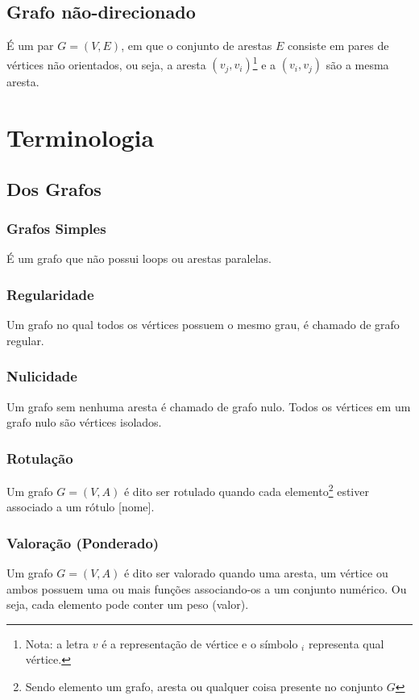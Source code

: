 \documentclass[12pt]{article}
\begin{document}
\subsection{Grafo não-direcionado}
É um par $G = (V, E)$, em que o conjunto de arestas $E$ consiste em pares de vértices não orientados, ou seja, a aresta $(v_j, v_i)$\footnote{
	Nota: a letra $v$ é a representação de vértice e o símbolo $_i$ representa qual vértice.
} e a $(v_i, v_j)$ são a mesma aresta.

\section{Terminologia}

\subsection{Dos Grafos}

\subsubsection{Grafos Simples}
É um grafo que não possui loops ou arestas paralelas.

\subsubsection{Regularidade}
Um grafo no qual todos os vértices possuem o mesmo grau, é chamado de grafo regular.

\subsubsection{Nulicidade}
Um grafo sem nenhuma aresta é chamado de grafo nulo. Todos os vértices em um grafo nulo são vértices isolados.

\subsubsection{Rotulação}
Um grafo $G = (V, A)$ é dito ser rotulado quando cada elemento\footnote{
	Sendo elemento um grafo, aresta ou qualquer coisa presente no conjunto $G$
} estiver associado a um rótulo [nome].

\subsubsection{Valoração (Ponderado)}
Um grafo $G = (V, A)$ é dito ser valorado quando uma aresta, um vértice ou ambos possuem uma  ou mais funções associando-os a um conjunto numérico.
Ou seja, cada elemento pode conter um peso (valor).
\end{document}
